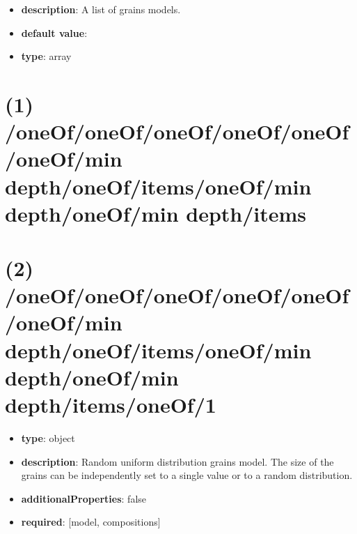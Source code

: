 \begin{itemize}[leftmargin=0em]\item {\bf description}: A list of grains models.
\item {\bf default value}: 
\item {\bf type}: array
\end{itemize}\section{(1) /oneOf/oneOf/oneOf/oneOf/oneOf/oneOf/min depth/oneOf/items/oneOf/min depth/oneOf/min depth/items}

\section{(2) /oneOf/oneOf/oneOf/oneOf/oneOf/oneOf/min depth/oneOf/items/oneOf/min depth/oneOf/min depth/items/oneOf/1}
\begin{itemize}[leftmargin=2em]\item {\bf type}: object
\item {\bf description}: Random uniform distribution grains model. The size of the grains can be independently set to a single value or to a random distribution.
\item {\bf additionalProperties}: false
\item {\bf required}: [model, compositions]\end{itemize}
